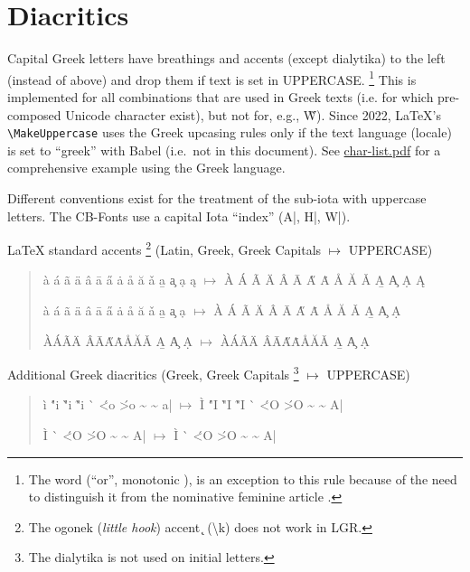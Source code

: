\documentclass{article}
\newcommand{\LGR}{\fontencoding{LGR}\selectfont}
\newcommand{\Latin}{\fontencoding{T1}\selectfont}
\newcommand{\cs}[1]{\texttt{\textbackslash#1}}
\begin{document}
\section{Diacritics}

Capital Greek letters have breathings and accents (except dialytika) to
the left (instead of above) and drop them if text is set in UPPERCASE.%
\footnote{The word  (``or'', monotonic ),
          is an exception to this rule because of the need to distinguish
	  it from the nominative feminine article .}
This is implemented for all combinations that are used in Greek texts
(i.e. for which pre-composed Unicode character exist), but not for,
e.g., \LGR\~W\Latin). Since 2022, LaTeX's \cs{MakeUppercase} uses the
Greek upcasing rules only if the text language (locale) is set to ``greek''
with Babel (i.e.\ not in this document).
See \href{char-list.pdf}{char-list.pdf} for a comprehensive
example using the Greek language.

Different conventions exist for the treatment of the sub-iota with uppercase
letters. The CB-Fonts use a capital Iota ``index'' (\LGR A|, H|, W|\Latin).

LaTeX standard accents%
\footnote{The ogonek (\emph{little hook}) accent \k{ } (\textbackslash k)
does not work in LGR.}
(Latin, Greek, Greek Capitals $\mapsto$ UPPERCASE)

\begin{quote}
  \`{a} \'{a} \~{a} \"{a} \^{a} \={a} \H{a} \.{a} \r{a} \u{a} \v{a}
  \b{a} \c{a} \d{a} \k{a}
  $\mapsto$ \MakeUppercase{%
  \`{a} \'{a} \~{a} \"{a} \^{a} \={a} \H{a} \.{a} \r{a} \u{a} \v{a}
  \b{a} \c{a} \d{a} \k{a}
  }

  \LGR
  \`{a} \'{a} \~{a} \"{a} \^{a} \={a} \H{a} \.{a} \r{a} \u{a} \v{a}
  \b{a} \c{a} \d{a}
  $\mapsto$ \MakeUppercase{%
  \`{a} \'{a} \~{a} \"{a} \^{a} \={a} \H{a} \.{a} \r{a} \u{a} \v{a}
  \b{a} \c{a} \d{a}
  }

  \`{A}\'{A}\~{A}\"{A} \^{A}\={A}\H{A}\.{A}\r{A}\u{A}\v{A}
  \b{A} \c{A} \d{A}
  $\mapsto$ \MakeUppercase{%
  \`{A}\'{A}\~{A}\"{A} \^{A}\={A}\H{A}\.{A}\r{A}\u{A}\v{A}
  \b{A} \c{A} \d{A}
  }
\end{quote}

Additional Greek diacritics
(Greek, Greek Capitals%
\footnote{The dialytika is not used on initial letters.}
$\mapsto$ UPPERCASE)

\begin{quote}
  \LGR
    \<\`{i} \'"i \`"i \~"i \` \'<{o}  \'>{o} \~ \~ a|
  $\mapsto$ \MakeUppercase{%
    \<\`{i} \'"i \`"i \~"i \` \'<{o}  \'>{o} \~ \~ a|
  }

    \<\`{I} \` \'<{O}  \'>{O} \~ \~ A|
  $\mapsto$ \MakeUppercase{%
    \<\`{I} \` \'<{O}  \'>{O} \~ \~ A|
  }
\end{quote}
\end{document}
